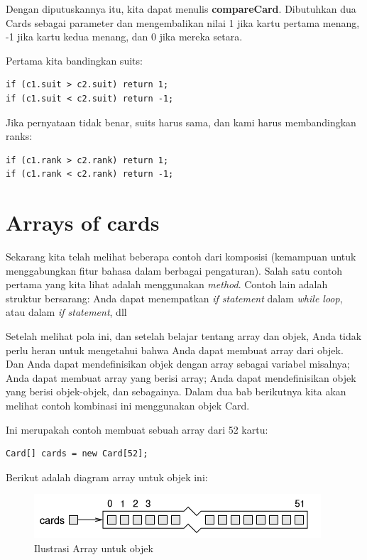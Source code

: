 \documentclass[12pt,b5paper,openright,twoside]{book}
\begin{document}
\noindent Dengan diputuskannya itu, kita dapat menulis \textbf{compareCard}. Dibutuhkan dua Cards sebagai parameter dan mengembalikan nilai 1 jika kartu pertama menang, -1 jika kartu kedua menang, dan 0 jika mereka setara.

\noindent Pertama kita bandingkan suits: 
\begin{lstlisting}
if (c1.suit > c2.suit) return 1; 
if (c1.suit < c2.suit) return -1; 
\end{lstlisting}

\noindent Jika pernyataan tidak benar, suits harus sama, dan kami harus membandingkan ranks: 
\begin{lstlisting}
if (c1.rank > c2.rank) return 1; 
if (c1.rank < c2.rank) return -1; 
\end{lstlisting}

\section{Arrays of cards}
Sekarang kita telah melihat beberapa contoh dari komposisi (kemampuan untuk menggabungkan fitur bahasa dalam berbagai pengaturan). Salah satu contoh pertama yang kita lihat adalah menggunakan \textit{method}. Contoh lain adalah struktur bersarang: Anda dapat menempatkan \textit{if statement} dalam \textit{while loop}, atau dalam \textit{if statement}, dll

\noindent Setelah melihat pola ini, dan setelah belajar tentang array dan objek, Anda tidak perlu heran untuk mengetahui bahwa Anda dapat membuat array dari objek. Dan Anda dapat mendefinisikan objek dengan array sebagai variabel misalnya; Anda dapat membuat array yang berisi array;
Anda dapat mendefinisikan objek yang berisi objek-objek, dan sebagainya. Dalam dua bab berikutnya kita akan melihat contoh kombinasi ini menggunakan objek Card.

\noindent Ini merupakah contoh membuat sebuah array dari 52 kartu:
\begin{lstlisting}
Card[] cards = new Card[52];
\end{lstlisting}

\noindent Berikut adalah diagram array untuk objek ini:
\begin{figure}[h!]
\centering
\includegraphics[scale=0.7]{diagram_array3.png}
\caption{Ilustrasi Array untuk objek}
\label{fig:univerise3}
\end{figure}
\end{document}

